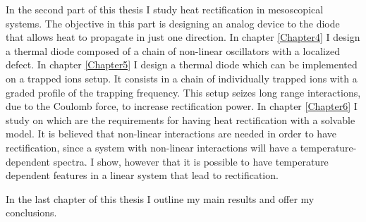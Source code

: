 In the second part of this thesis I study heat rectification in mesoscopical systems. The objective in this part is designing an analog device to the diode that allows heat to propagate in just one direction. In chapter \ref{Chapter4} I design a thermal diode composed of a chain of non-linear oscillators with a localized defect. In chapter \ref{Chapter5} I design a thermal diode which can be implemented on a trapped ions setup. It consists in a chain of individually trapped ions with a graded profile of the trapping frequency. This setup seizes long range interactions, due to the Coulomb force, to increase rectification power. In chapter \ref{Chapter6} I study on which are the requirements for having heat rectification with a solvable model. It is believed that non-linear interactions are needed in order to have rectification, since a system with non-linear interactions will have a temperature-dependent spectra. I show, however that it is possible to have temperature dependent features in a linear system that lead to rectification.

In the last chapter of this thesis I outline my main results and offer my conclusions.








